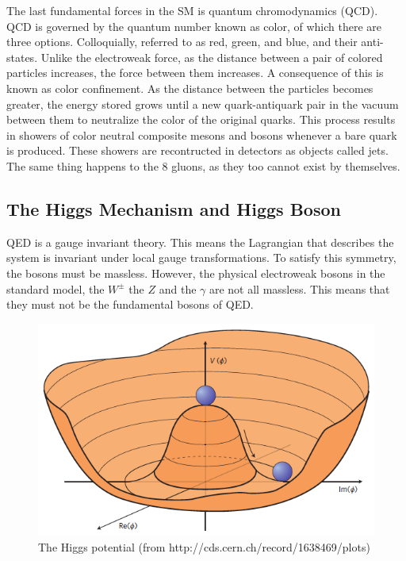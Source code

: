 
The last fundamental forces in the SM is quantum chromodynamics (QCD). QCD is governed by the quantum number known as color, of which there are three options. Colloquially, referred to as red, green, and blue, and their anti-states. Unlike the electroweak force, as the distance between a pair of colored particles increases, the force between them increases. A consequence of this is known as color confinement. As the distance between the particles becomes greater, the energy stored grows until a new quark-antiquark pair in the vacuum between them to neutralize the color of the original quarks. This process results in showers of color neutral composite mesons and bosons  whenever a bare quark is produced. These showers are recontructed in detectors as objects called jets. The same thing happens to the 8 gluons, as they too cannot exist by themselves.
\subsection{The Higgs Mechanism and Higgs Boson}
\label{ssec:Higgs}
QED is a gauge invariant theory. This means the Lagrangian that describes the system is invariant under local gauge transformations. To satisfy this symmetry, the bosons must be massless. However, the physical electroweak bosons in the standard model, the ${W^{\pm}}$ the ${Z}$ and the ${\gamma}$ are not all massless. This means that they must not be the fundamental bosons of QED.\linebreak

\begin{figure}[h]
\begin{center}
\includegraphics[scale=0.65]{figures/higgspotential}
\caption{The Higgs potential (from http://cds.cern.ch/record/1638469/plots) }
\label{Fig:higgspot}
\end{center}
\end{figure}

